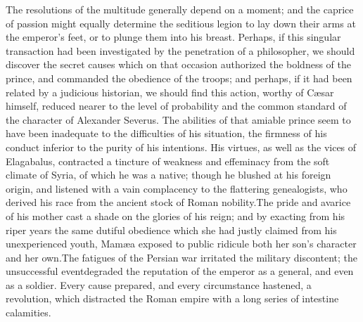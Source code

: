 


The resolutions of the multitude generally depend on a moment;
and the caprice of passion might equally determine the seditious
legion to lay down their arms at the emperor’s feet, or to plunge
them into his breast. Perhaps, if this singular transaction had
been investigated by the penetration of a philosopher, we should
discover the secret causes which on that occasion authorized the
boldness of the prince, and commanded the obedience of the
troops; and perhaps, if it had been related by a judicious
historian, we should find this action, worthy of Cæsar himself,
reduced nearer to the level of probability and the common
standard of the character of Alexander Severus. The abilities of
that amiable prince seem to have been inadequate to the
difficulties of his situation, the firmness of his conduct
inferior to the purity of his intentions. His virtues, as well as
the vices of Elagabalus, contracted a tincture of weakness and
effeminacy from the soft climate of Syria, of which he was a
native; though he blushed at his foreign origin, and listened
with a vain complacency to the flattering genealogists, who
derived his race from the ancient stock of Roman nobility.\footnotemark[79] The
pride and avarice of his mother cast a shade on the glories of
his reign; and by exacting from his riper years the same dutiful
obedience which she had justly claimed from his unexperienced
youth, Mamæa exposed to public ridicule both her son’s character
and her own.\footnotemark[80] The fatigues of the Persian war irritated the
military discontent; the unsuccessful event\footnotemark[801] degraded the
reputation of the emperor as a general, and even as a soldier.
Every cause prepared, and every circumstance hastened, a
revolution, which distracted the Roman empire with a long series
of intestine calamities.


